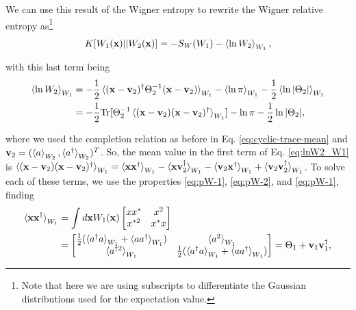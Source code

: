 \begin{apendicesenv}
We can use this result of the Wigner entropy to rewrite the Wigner relative entropy as\footnote{Note that here we are using subscripts to differentiate the Gaussian distributions used for the expectation value.}
\begin{equation}
    K[W_1(\mathbf{x}) || W_2(\mathbf{x})] = - S_W(W_1) - \braket{\ln W_2}_{W_1},
    \label{eq:Kw-forma-meio}
\end{equation}

\noindent with this last term being
\begin{equation}
    \begin{split}
        \braket{\ln W_2}_{W_1} &= - \frac{1}{2} \braket{(\mathbf{x} - \mathbf{v}_2)^\dagger \Theta^{-1}_2 (\mathbf{x} - \mathbf{v}_2)}_{W_1} - \braket{\ln \pi}_{W_1} - \frac{1}{2} \braket{\ln |\Theta_2|}_{W_1}\\
        &= - \frac{1}{2} \text{Tr}[ \Theta^{-1}_2 \braket{(\mathbf{x} - \mathbf{v}_2)(\mathbf{x} - \mathbf{v}_2)^\dagger}_{W_1}] - \ln \pi -\frac{1}{2} \ln |\Theta_2|,
    \end{split}
    \label{eq:lnW2_W1}
\end{equation}

\noindent where we used the completion relation as before in Eq. \eqref{eq:cyclic-trace-mean} and $\mathbf{v}_2 = (\braket{a}_{W_2}, \braket{a^\dagger}_{W_2})^T$. So, the mean value in the first term of Eq. \ref{eq:lnW2_W1} is $\braket{(\mathbf{x} - \mathbf{v}_2)(\mathbf{x} - \mathbf{v}_2)^\dagger}_{W_1} = \braket{\mathbf{x}\mathbf{x}^\dagger}_{W_1} - \braket{\mathbf{x}\mathbf{v}_2^\dagger}_{W_1} - \braket{\mathbf{v}_2\mathbf{x}^\dagger}_{W_1} + \braket{\mathbf{v}_2\mathbf{v}_2^\dagger}_{W_1}$. To solve each of these terms, we use the properties \ref{eq:pW-1}, \ref{eq:pW-2}, and \ref{eq:pW-1}, finding 
\begin{equation}
    \begin{split}
        \braket{\mathbf{x} \mathbf{x}^\dagger}_{W_1} &= \int d\mathbf{x} W_1(\mathbf{x})
        \begin{bmatrix}
            x x^* & x^2\\
            x^{*2} & x^* x
        \end{bmatrix}\\
        &= \begin{bmatrix}
            \frac{1}{2}(\braket{a^\dagger a}_{W_1} + \braket{a a^\dagger}_{W_1}) & \braket{a^2}_{W_1}\\
            \braket{a^{\dagger2}}_{W_1} & \frac{1}{2}(\braket{a^\dagger a}_{W_1} + \braket{a a^\dagger}_{W_1})
        \end{bmatrix} =\Theta_1 + \mathbf{v}_1 \mathbf{v}_1^\dagger,
    \end{split}
\end{equation}


\end{apendicesenv}
